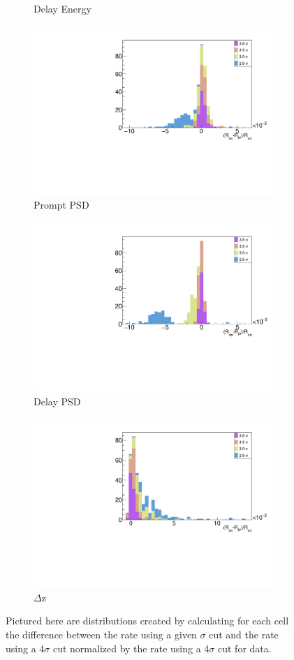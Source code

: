\begin{figure}[H]
\begin{subfigure}{0.5\linewidth}
		\caption{Delay Energy}
	\end{subfigure}
	\begin{subfigure}{0.5\linewidth}
		\centering
		\includegraphics[width=0.85\linewidth]{tex/6-ac227-images/Systematics_Cuts/ResidVsCell_PromptPSDCut}
		\caption{Prompt PSD}
	\end{subfigure}
	\begin{subfigure}{0.5\linewidth}
		\centering
		\includegraphics[width=0.85\linewidth]{tex/6-ac227-images/Systematics_Cuts/ResidVsCell_DelayPSDCut}
		\caption{Delay PSD}
	\end{subfigure}
	\begin{subfigure}{1\linewidth}
		\centering
		\includegraphics[width=0.425\linewidth]{tex/6-ac227-images/Systematics_Cuts/ResidVsCell_DzCut}
		\caption{$\Delta$z}
	\end{subfigure}
	\caption{Pictured here are distributions created by calculating for each cell the difference between the rate using a given $\sigma$ cut and the rate using a 4$\sigma$ cut normalized by the rate using a 4$\sigma$ cut for data.}
	\label{fig:CutSys}
\end{figure}

